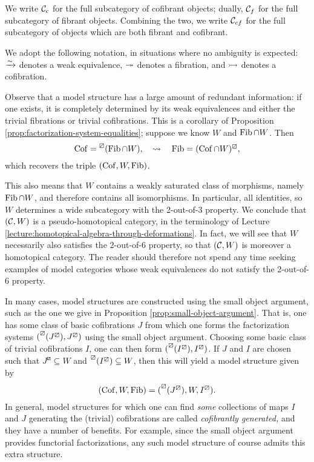 \begin{notation}
	We write \(\mathcal{C}_c\) for the full subcategory of cofibrant objects; dually, \(\mathcal{C}_f\) for the full subcategory of fibrant objects. Combining the two,
	we write \(\mathcal{C}_{cf}\) for the full subcategory of objects which are both fibrant and cofibrant.
\end{notation}
\begin{notation}
	We adopt the following notation, in situations where no ambiguity is expected: \(\xrightarrow{\sim}\) denotes a weak equivalence, \(\twoheadrightarrow\) denotes a fibration, and \(\rightarrowtail\)
	denotes a cofibration.
\end{notation}
\begin{remark}
	Observe that a model structure has a large amount of redundant information: if one exists, it is completely determined by its weak equivalences
	and either the trivial fibrations or trivial cofibrations. This is a corollary of Proposition \ref{prop:factorization-system-equalities}; suppose we know
	\(W\) and \(\operatorname{Fib}\cap W\). Then
	\[ \operatorname{Cof} = \prescript{\boxslash}{}{(\operatorname{Fib}\cap W)},\quad \leadsto\quad \operatorname{Fib} = (\operatorname{Cof}\cap W)^\boxslash, \]
	which recovers the triple \((\operatorname{Cof},W,\operatorname{Fib})\).

	This also means that \(W\) contains a weakly saturated class of morphisms, namely \(\operatorname{Fib}\cap W\), and therefore contains all isomorphisms. In particular, all identities,
	so \(W\) determines a wide subcategory with the 2-out-of-3 property. We conclude that \((\mathcal{C},W)\) is a pseudo-homotopical category, in the terminology
	of Lecture \ref{lecture:homotopical-algebra-through-deformations}. In fact, we will see that \(W\) necessarily also satisfies the 2-out-of-6 property,
	so that \((\mathcal{C},W)\) is moreover a homotopical category. The reader should therefore not spend any time seeking examples of model categories whose weak
	equivalences do not satisfy the 2-out-of-6 property.
\end{remark}
\begin{remark}
	In many cases, model structures are constructed using the small object argument, such as the one we give in Proposition \ref{prop:small-object-argument}. That is,
	one has some class of basic cofibrations \(J\) from which one forms the factorization systems \((\prescript{\boxslash}{}{(J^\boxslash)},J^\boxslash)\) using the small
	object argument. Choosing some basic class of trivial cofibrations \(I\), one can then form \((\prescript{\boxslash}{}{(I^\boxslash)},I^\boxslash)\). If \(J\)
	and \(I\) are chosen such that \(J^\boxslash \subseteq W\) and \(\prescript{\boxslash}{}{(I^\boxslash)} \subseteq W\), then this will yield a model structure given by
	\[ (\operatorname{Cof},W,\operatorname{Fib}) = (\prescript{\boxslash}{}{(J^\boxslash)},W,I^\boxslash). \]
	In general, model structures for which one can find \emph{some} collections of maps \(I\) and \(J\) generating the (trivial) cofibrations are called \emph{cofibrantly generated,} and they have a
	number of benefits. For example, since the small object argument provides functorial factorizations, any such model structure of course admits this extra structure.
\end{remark}
